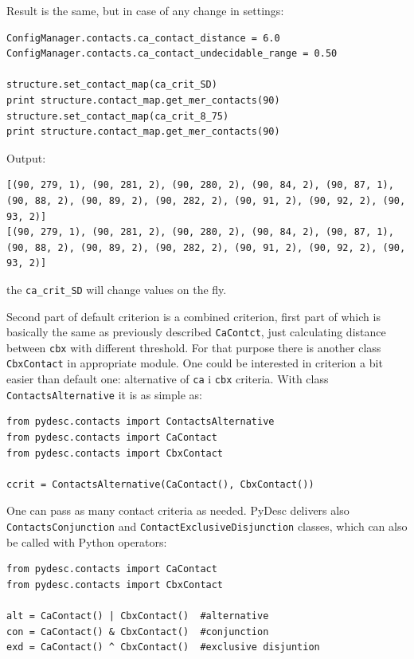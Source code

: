 \documentclass{article}
\begin{document}
Result is the same, but in case of any change in settings:

\begin{lstlisting}
ConfigManager.contacts.ca_contact_distance = 6.0
ConfigManager.contacts.ca_contact_undecidable_range = 0.50

structure.set_contact_map(ca_crit_SD)
print structure.contact_map.get_mer_contacts(90)
structure.set_contact_map(ca_crit_8_75)
print structure.contact_map.get_mer_contacts(90)
\end{lstlisting}
Output:
\begin{lstlisting}
[(90, 279, 1), (90, 281, 2), (90, 280, 2), (90, 84, 2), (90, 87, 1), (90, 88, 2), (90, 89, 2), (90, 282, 2), (90, 91, 2), (90, 92, 2), (90, 93, 2)]
[(90, 279, 1), (90, 281, 2), (90, 280, 2), (90, 84, 2), (90, 87, 1), (90, 88, 2), (90, 89, 2), (90, 282, 2), (90, 91, 2), (90, 92, 2), (90, 93, 2)]
\end{lstlisting}

the \texttt{ca\_crit\_SD} will change values on the fly.

Second part of default criterion is a combined criterion, first part of which is basically the same as previously described \texttt{CaContct}, just calculating distance between \texttt{cbx} with different threshold. For that purpose there is another class \texttt{CbxContact} in appropriate module. One could be interested in criterion a bit easier than default one: alternative of \texttt{ca} i \texttt{cbx} criteria. With class \texttt{ContactsAlternative} it is as simple as:

\begin{lstlisting}
from pydesc.contacts import ContactsAlternative
from pydesc.contacts import CaContact
from pydesc.contacts import CbxContact

ccrit = ContactsAlternative(CaContact(), CbxContact())
\end{lstlisting}

One can pass as many contact criteria as needed. PyDesc delivers also \texttt{ContactsConjunction} and \texttt{ContactExclusiveDisjunction} classes, which can also be called with Python operators:

\begin{lstlisting}
from pydesc.contacts import CaContact
from pydesc.contacts import CbxContact

alt = CaContact() | CbxContact()  #alternative
con = CaContact() & CbxContact()  #conjunction
exd = CaContact() ^ CbxContact()  #exclusive disjuntion
\end{lstlisting}
\end{document}
